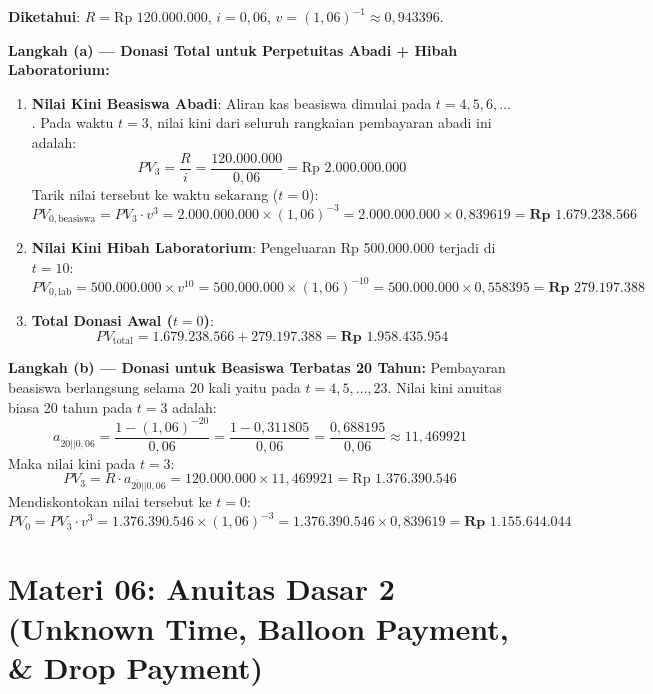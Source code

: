 \documentclass[11pt,a4paper]{article}
\newcommand{\angl}[1]{\overline{#1|}}
\begin{document}
\begin{solusibox}
\textbf{Diketahui}: $R = \text{Rp } 120.000.000$, $i = 0{,}06$, $v = (1{,}06)^{-1} \approx 0{,}943396$.

\textbf{Langkah (a) --- Donasi Total untuk Perpetuitas Abadi + Hibah Laboratorium:}
\begin{enumerate}[leftmargin=4mm, topsep=1pt, itemsep=1pt]
    \item \textbf{Nilai Kini Beasiswa Abadi}:  
    Aliran kas beasiswa dimulai pada $t=4, 5, 6, \dots$. Pada waktu $t=3$, nilai kini dari seluruh rangkaian pembayaran abadi ini adalah:
    $$PV_3 = \frac{R}{i} = \frac{120.000.000}{0{,}06} = \text{Rp } 2.000.000.000$$
    Tarik nilai tersebut ke waktu sekarang ($t=0$):
    $$PV_{0, \text{beasiswa}} = PV_3 \cdot v^3 = 2.000.000.000 \times (1{,}06)^{-3} = 2.000.000.000 \times 0{,}839619 = \mathbf{\text{Rp } 1.679.238.566}$$
    
    \item \textbf{Nilai Kini Hibah Laboratorium}:  
    Pengeluaran Rp 500.000.000 terjadi di $t=10$:
    $$PV_{0, \text{lab}} = 500.000.000 \times v^{10} = 500.000.000 \times (1{,}06)^{-10} = 500.000.000 \times 0{,}558395 = \mathbf{\text{Rp } 279.197.388}$$
    
    \item \textbf{Total Donasi Awal ($t=0$)}:
    $$PV_{\text{total}} = 1.679.238.566 + 279.197.388 = \mathbf{\text{Rp } 1.958.435.954}$$
\end{enumerate}

\textbf{Langkah (b) --- Donasi untuk Beasiswa Terbatas 20 Tahun:}
Pembayaran beasiswa berlangsung selama 20 kali yaitu pada $t=4, 5, \dots, 23$.  
Nilai kini anuitas biasa 20 tahun pada $t=3$ adalah:
$$a_{\angl{20}|0{,}06} = \frac{1 - (1{,}06)^{-20}}{0{,}06} = \frac{1 - 0{,}311805}{0{,}06} = \frac{0{,}688195}{0{,}06} \approx 11{,}469921$$
Maka nilai kini pada $t=3$:
$$PV_3 = R \cdot a_{\angl{20}|0{,}06} = 120.000.000 \times 11{,}469921 = \text{Rp } 1.376.390.546$$
Mendiskontokan nilai tersebut ke $t=0$:
$$PV_0 = PV_3 \cdot v^3 = 1.376.390.546 \times (1{,}06)^{-3} = 1.376.390.546 \times 0{,}839619 = \mathbf{\text{Rp } 1.155.644.044}$$
\end{solusibox}

\newpage

\section*{Materi 06: Anuitas Dasar 2 (Unknown Time, Balloon Payment, \& Drop Payment)}
\end{document}
